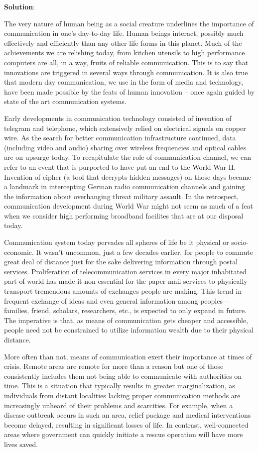 \documentclass[
]{book}
\newenvironment{solution}{ {\bfseries Solution}:}{}
\begin{document}
\begin{solution}

The very nature of human being as a social creature underlines the importance of communication in one's day-to-day life. Human beings interact, possibly much effectively and efficiently than any other life forms in this planet. Much of the achievements we are relishing today, from kitchen utensils to high performance computers are all, in a way, fruits of reliable communication. This is to say that innovations are triggered in several ways through communication. It is also true that modern day communication, we use in the form of media and technology, have been made possible by the feats of human innovation -- once again guided by state of the art communication systems.

Early developments in communication technology consisted of invention of telegram and telephone, which extensively relied on electrical signals on copper wire. As the search for better communication infrastructure continued, data (including video and audio) sharing over wireless frequencies and optical cables are on upsurge today. To recapitulate the role of communication channel, we can refer to an event that is purported to have put an end to the World War II. Invention of cipher (a tool that decrypts hidden messages) on those days became a landmark in intercepting German radio communication channels and gaining the information about overhanging threat military assault. In the retrospect, communication development during World War might not seem as much of a feat when we consider high performing broadband facilites that are at our disposal today.

Communication system today pervades all spheres of life be it physical or socio-economic. It wasn't uncommon, just a few decades earlier, for people to commute great deal of distance just for the sake delivering information through postal services. Proliferation of telecommunication services in every major inhabitated part of world has made it non-essential for the paper mail services to physically transport tremendous amounts of exchanges people are making. This trend in frequent exchange of ideas and even general information among peoples -- families, friend, scholars, researchers, etc., is expected to only expand in future. The imperative is that, as means of communication gets cheaper and accessible, people need not be constrained to utilize information wealth due to their physical distance.

More often than not, means of communication exert their importance at times of crisis. Remote areas are remote for more than a reason but one of those consistently includes them not being able to communicate with authorities on time. This is a situation that typically results in greater marginalization, as individuals from distant localities lacking proper communication methods are increasingly unheard of their problems and scarcities. For example, when a disease outbreak occurs in such an area, relief package and medical interventions become delayed, resulting in significant losses of life. In contrast, well-connected areas where government can quickly initiate a rescue operation will have more lives saved.


\end{solution}
\end{document}
